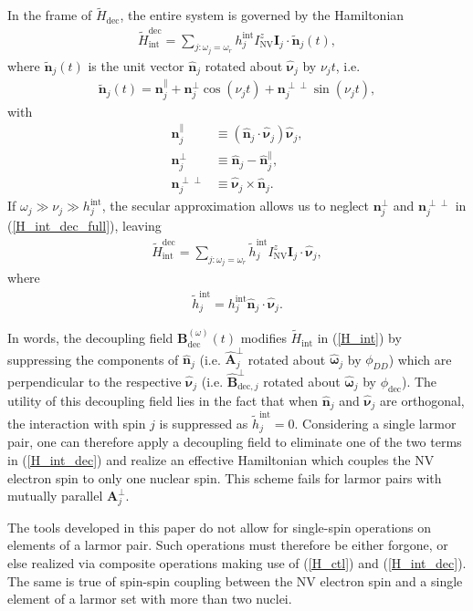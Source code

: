 \documentclass[twocolumn]{revtex4}
\renewcommand{\t}{\text} %
\newcommand{\p}[1]{\left(#1\right)} %
\renewcommand{\v}{\bm} %
\newcommand{\uv}[1]{\hat{\v{#1}}} %
\renewcommand{\c}{\cdot} %
\newcommand{\NV}{\t{NV}}
\begin{document}
In the frame of $\tilde H_\t{dec}$, the entire system is governed by
the Hamiltonian
\begin{align}
  \tilde H_\t{int}^\t{dec} = \sum_{j:\omega_j=\omega_r}
  h_j^\t{int}I_\NV^z\v I_j\c\tilde{\v n}_j\p{t},
  \label{H_int_dec_full}
\end{align}
where $\tilde{\v n}_j\p{t}$ is the unit vector $\uv n_j$ rotated
about $\uv\nu_j$ by $\nu_jt$, i.e.
\begin{align}
  \tilde{\v n}_j\p{t} = \v n_j^\parallel +
  \v n_j^\perp\cos\p{\nu_jt} + \v n_j^{\perp\perp}\sin\p{\nu_jt},
\end{align}
with
\begin{align}
  \v n_j^\parallel &\equiv \p{\uv n_j\c\uv\nu_j}\uv\nu_j, \\
  \v n_j^\perp &\equiv \uv n_j - \uv n_j^\parallel, \\
  \v n_j^{\perp\perp} &\equiv \uv\nu_j\times\uv n_j.
\end{align}
If $\omega_j\gg\nu_j\gg h_j^\t{int}$, the secular approximation allows
us to neglect $\v n_j^\perp$ and $\v n_j^{\perp\perp}$ in
(\ref{H_int_dec_full}), leaving
\begin{align}
  \tilde H_\t{int}^\t{dec}
  = \sum_{j:\omega_j=\omega_r}
  \tilde h_j^\t{int}I_\NV^z\v I_j\c\uv\nu_j,
  \label{H_int_dec}
\end{align}
where
\begin{align}
  \tilde h_j^\t{int} = h_j^\t{int}\uv n_j\c\uv\nu_j.
\end{align}

In words, the decoupling field $\v B_\t{dec}^{\p\omega}\p{t}$ modifies
$\tilde H_\t{int}$ in (\ref{H_int}) by suppressing the components of
$\uv n_j$ (i.e. $\uv A_j^\perp$ rotated about $\uv\omega_j$ by
$\phi_{DD}$) which are perpendicular to the respective $\uv\nu_j$
(i.e.  $\uv B_{\t{dec},j}^\perp$ rotated about $\uv\omega_j$ by
$\phi_\t{dec}$). The utility of this decoupling field lies in the fact
that when $\uv n_j$ and $\uv\nu_j$ are orthogonal, the interaction
with spin $j$ is suppressed as $\tilde h_j^\t{int}=0$. Considering a
single larmor pair, one can therefore apply a decoupling field to
eliminate one of the two terms in (\ref{H_int_dec}) and realize an
effective Hamiltonian which couples the NV electron spin to only one
nuclear spin. This scheme fails for larmor pairs with mutually
parallel $\v A_j^\perp$.

The tools developed in this paper do not allow for single-spin
operations on elements of a larmor pair. Such operations must
therefore be either forgone, or else realized via composite operations
making use of (\ref{H_ctl}) and (\ref{H_int_dec}). The same is true of
spin-spin coupling between the NV electron spin and a single element
of a larmor set with more than two nuclei.
\end{document}

